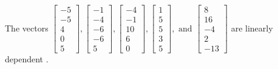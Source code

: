 \begin{exercise}
\begin{exerciseStatement}
  \end{exerciseStatement}
  \begin{exerciseAnswer}
   The vectors \(\left[\begin{array}{r}
-5 \\
-5 \\
4 \\
0 \\
5
\end{array}\right] , \left[\begin{array}{r}
-1 \\
-4 \\
-6 \\
-6 \\
5
\end{array}\right] , \left[\begin{array}{r}
-4 \\
-1 \\
10 \\
6 \\
0
\end{array}\right] , \left[\begin{array}{r}
1 \\
5 \\
5 \\
3 \\
5
\end{array}\right] , \text{ and } \left[\begin{array}{r}
8 \\
16 \\
-4 \\
2 \\
-13
\end{array}\right]\) are 
  	 linearly dependent  .
  


  \end{exerciseAnswer}
\end{exercise}